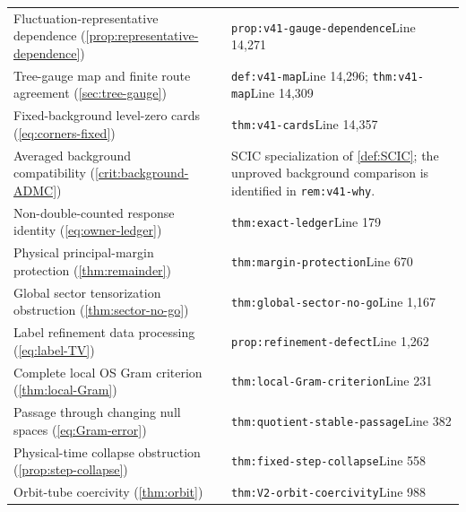 \documentclass[11pt,oneside,openany]{book}
\theoremstyle{definition}
\theoremstyle{remark}
\begin{document}
\begin{longtable}{L{0.32\textwidth}L{0.12\textwidth}L{0.477\textwidth}}
Fluctuation-representative dependence (\cref{prop:representative-dependence}) & \cite{F11} & \nolinkurl{prop:v41-gauge-dependence}\newline Line 14,271 \\
Tree-gauge map and finite route agreement (\cref{sec:tree-gauge}) & \cite{F11} & \nolinkurl{def:v41-map}\newline Line 14,296; \nolinkurl{thm:v41-map}\newline Line 14,309 \\
Fixed-background level-zero cards (\cref{eq:corners-fixed}) & \cite{F11} & \nolinkurl{thm:v41-cards}\newline Line 14,357 \\
Averaged background compatibility (\cref{crit:background-ADMC}) & \cite{F9,F11} & SCIC specialization of \cref{def:SCIC}; the unproved background comparison is identified in \nolinkurl{rem:v41-why}. \\
Non-double-counted response identity (\cref{eq:owner-ledger}) & \cite{PAR} & \nolinkurl{thm:exact-ledger}\newline Line 179 \\
Physical principal-margin protection (\cref{thm:remainder}) & \cite{PAR} & \nolinkurl{thm:margin-protection}\newline Line 670 \\
Global sector tensorization obstruction (\cref{thm:sector-no-go}) & \cite{PAR} & \nolinkurl{thm:global-sector-no-go}\newline Line 1,167 \\
Label refinement data processing (\cref{eq:label-TV}) & \cite{PAR} & \nolinkurl{prop:refinement-defect}\newline Line 1,262 \\
Complete local OS Gram criterion (\cref{thm:local-Gram}) & \cite{F1} & \nolinkurl{thm:local-Gram-criterion}\newline Line 231 \\
Passage through changing null spaces (\cref{eq:Gram-error}) & \cite{F1} & \nolinkurl{thm:quotient-stable-passage}\newline Line 382 \\
Physical-time collapse obstruction (\cref{prop:step-collapse}) & \cite{F1} & \nolinkurl{thm:fixed-step-collapse}\newline Line 558 \\
Orbit-tube coercivity (\cref{thm:orbit}) & \cite{F1} & \nolinkurl{thm:V2-orbit-coercivity}\newline Line 988 \\

\end{longtable}
\end{document}

